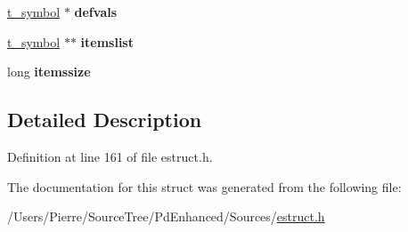 \begin{DoxyCompactItemize}
\item 
\hypertarget{struct__eattr_a924d892a1bc151dc21e9b93a5ff7f6fb}{\hyperlink{struct__symbol}{t\-\_\-symbol} $\ast$ {\bfseries defvals}}\label{struct__eattr_a924d892a1bc151dc21e9b93a5ff7f6fb}

\item 
\hypertarget{struct__eattr_a8d196437fdcc2bd7fae8c1d8715bfcd2}{\hyperlink{struct__symbol}{t\-\_\-symbol} $\ast$$\ast$ {\bfseries itemslist}}\label{struct__eattr_a8d196437fdcc2bd7fae8c1d8715bfcd2}

\item 
\hypertarget{struct__eattr_a8beb98feff626231b8525e20c7157163}{long {\bfseries itemssize}}\label{struct__eattr_a8beb98feff626231b8525e20c7157163}

\end{DoxyCompactItemize}


\subsection{Detailed Description}


Definition at line 161 of file estruct.\-h.



The documentation for this struct was generated from the following file\-:\begin{DoxyCompactItemize}
\item 
/\-Users/\-Pierre/\-Source\-Tree/\-Pd\-Enhanced/\-Sources/\hyperlink{estruct_8h}{estruct.\-h}\end{DoxyCompactItemize}
